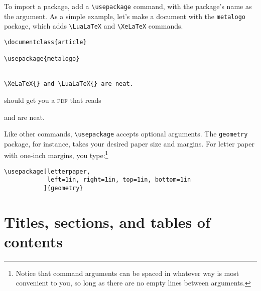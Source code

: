 To import a package, add a \verb|\usepackage| command,
with the package's name as the argument.
As a simple example, let's make a document with the \texttt{metalogo}
package, which adds \verb|\LuaLaTeX| and \verb|\XeLaTeX| commands.
\begin{leftfigure}
\begin{lstlisting}
\documentclass{article}

\usepackage{metalogo}


\XeLaTeX{} and \LuaLaTeX{} are neat.

\end{lstlisting}
\end{leftfigure}
\begin{samepage}
should get you a \textsc{pdf} that reads
\begin{leftfigure}
\lm \XeLaTeX{} and \LuaLaTeX{} are neat.
\end{leftfigure}
\end{samepage}
Like other commands, \verb|\usepackage| accepts optional arguments.
The \texttt{geometry} package, for instance,
takes your desired paper size and margins.
For  letter paper with one-inch margins, you type:\footnote{Notice
that command arguments can be spaced in whatever way is most convenient to you,
so long as there are no empty lines between arguments.}
\begin{leftfigure}
\begin{lstlisting}
\usepackage[letterpaper,
            left=1in, right=1in, top=1in, bottom=1in
           ]{geometry}
\end{lstlisting}
\end{leftfigure}

\section{Titles, sections, and tables of contents}

